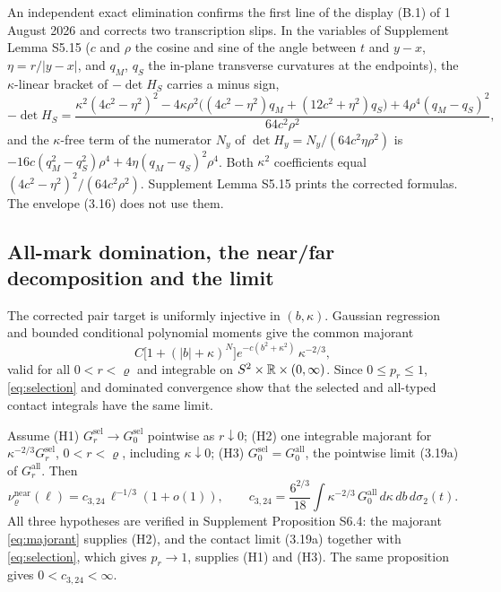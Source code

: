 \begin{remark}\label{rem:B1}
An independent exact elimination  confirms the first line of the display (B.1) of 1 August 2026 and corrects two transcription slips. In the variables of Supplement Lemma S5.15 ($c$ and $\rho$ the cosine and sine of the angle between $t$ and $y-x$, $\eta=r/|y-x|$, and $q_M$, $q_S$ the in-plane transverse curvatures at the endpoints), the $\kappa$-linear bracket of $-\det H_S$ carries a minus sign,
\[
-\det H_S=\frac{\kappa^2(4c^2-\eta^2)^2-4\kappa\rho^2\bigl((4c^2-\eta^2)q_M+(12c^2+\eta^2)q_S\bigr)+4\rho^4(q_M-q_S)^2}{64c^2\rho^2},
\]
and the $\kappa$-free term of the numerator $N_y$ of $\det H_y=N_y/(64c^2\eta\rho^2)$ is $-16c(q_M^2-q_S^2)\rho^4+4\eta(q_M-q_S)^2\rho^4$. Both $\kappa^2$ coefficients equal $(4c^2-\eta^2)^2/(64c^2\rho^2)$. Supplement Lemma S5.15 prints the corrected formulas. The envelope (3.16) does not use them.
\end{remark}

\subsection{All-mark domination, the near/far decomposition and the limit}\label{ssec:limit}

The corrected pair target is uniformly injective in $(b,\kappa)$. Gaussian regression and bounded conditional polynomial moments give the common majorant
\begin{equation}\tag{3.19}\label{eq:majorant}
C\bigl[1+(|b|+\kappa)^N\bigr]e^{-c(b^2+\kappa^2)}\,\kappa^{-2/3},
\end{equation}
valid for all $0<r<\varrho$ and integrable on $S^2\times\mathbb R\times(0,\infty)$. Since $0\le p_r\le1$, \eqref{eq:selection} and dominated convergence show that the selected and all-typed contact integrals have the same limit.

\begin{theorem}\label{thm:interchange}
Assume (H1) $G^{\mathrm{sel}}_r\to G^{\mathrm{sel}}_0$ pointwise as $r\downarrow0$; (H2) one integrable majorant for $\kappa^{-2/3}G^{\mathrm{sel}}_r$, $0<r<\varrho$, including $\kappa\downarrow0$; (H3) $G^{\mathrm{sel}}_0=G^{\mathrm{all}}_0$, the pointwise limit (3.19a) of $G^{\mathrm{all}}_r$. Then
\[
\nu^{\mathrm{near}}_\varrho(\ell)=c_{3,24}\,\ell^{-1/3}(1+o(1)),\qquad c_{3,24}=\frac{6^{2/3}}{18}\int\kappa^{-2/3}\,G^{\mathrm{all}}_0\,d\kappa\,db\,d\sigma_2(t).
\]
All three hypotheses are verified in Supplement Proposition S6.4: the majorant \eqref{eq:majorant} supplies (H2), and the contact limit (3.19a) together with \eqref{eq:selection}, which gives $p_r\to1$, supplies (H1) and (H3). The same proposition gives $0<c_{3,24}<\infty$.
\end{theorem}

